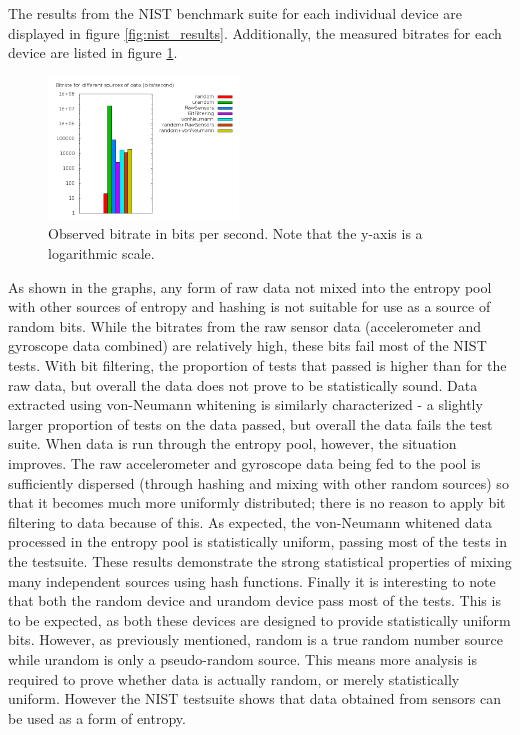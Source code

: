 
The results from the NIST benchmark suite for each individual device are
displayed in figure \ref{fig:nist_results}.  Additionally, the measured
bitrates for each device are listed in figure \ref{fig:bitrates}.

\begin{figure}[h]
	\centering
	\includegraphics[width=0.45\textwidth]{bitrate.png}
	\caption{Observed bitrate in bits per second.  Note that the y-axis is 
a logarithmic scale.}
	\label{fig:bitrates}
\end{figure}

As shown in the graphs, any form of raw data not mixed into the entropy pool
with other sources of entropy and hashing is not suitable for use as a source
of random bits.  While the bitrates from the raw sensor data (accelerometer
and gyroscope data combined) are relatively high, these bits fail most of the
NIST tests.  With bit filtering, the proportion of tests that passed is higher
than for the raw data, but overall the data does not prove to be statistically
sound.  Data extracted using von-Neumann whitening is similarly characterized -
a slightly larger proportion of tests on the data passed, but overall the data
fails the test suite.  When data is run through the entropy pool, however, the
situation improves.  The raw accelerometer and gyroscope data being fed to the
pool is sufficiently dispersed (through hashing and mixing with other random
sources) so that it becomes much more uniformly distributed; there is no
reason to apply bit filtering to data because of this.  As expected, the
von-Neumann whitened data processed in the entropy pool is statistically
uniform, passing most of the tests in the testsuite.  These results demonstrate
the strong statistical properties of mixing many independent sources using hash
functions.  Finally it is interesting to note that both the random device and
urandom device pass most of the tests.  This is to be expected, as both these
devices are designed to provide statistically uniform bits.  However, as
previously mentioned, random is a true random number source while urandom is
only a pseudo-random source.  This means more analysis is required to prove
whether data is actually random, or merely statistically uniform.  However the
NIST testsuite shows that data obtained from sensors can be used as a form of
entropy.

